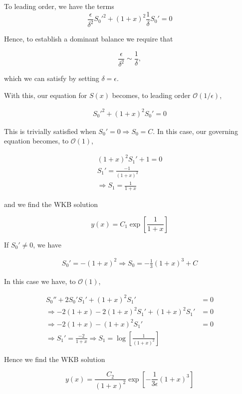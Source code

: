 \documentclass[12pt, a4paper]{article}
\begin{document}
\begin{enumerate}
\begin{enumerate}
        To leading order, we have the terms $$\frac{\epsilon}{\delta^2} {S_0'}^2 + (1+x)^2 \frac{1}{\delta} S_0' = 0$$

        Hence, to establish a dominant balance we require that

        $$\frac{\epsilon}{\delta^2} \sim \frac{1}{\delta},$$

        which we can satisfy by setting $\delta = \epsilon$. 

        With this, our equation for $S(x)$ becomes, to leading order $\mathcal O(1/\epsilon)$, 

        \begin{align*}
            {S_0'}^2 + (1+x)^2 S_0' = 0 
        \end{align*}

        This is trivially satisfied when $S_0'=0 \Rightarrow S_0 = C$. In this case, our governing equation becomes, to $\mathcal O(1)$, 

        \begin{align*}
            (1+x)^2 S_1' + 1 = 0 \\ S_1' = \frac{-1}{(1+x)^2} \\ \Rightarrow S_1 = \frac{1}{1+x}
        \end{align*}

        and we find the WKB solution 

        $$y(x) = C_1 \exp \left[  \frac{1}{1+x} \right]$$
        
        If $S_0' \ne 0$, we have 

        \begin{align*}
            S_0' = -(1+x)^2 \Rightarrow S_0 = - \frac{1}{3} (1+x)^3 + C
        \end{align*}

        In this case we have, to $\mathcal O(1)$, 

        \begin{align*}
            S_0'' + 2 S_0' S_1' + (1+x)^2 S_1' &= 0 \\
            \Rightarrow -2(1+x) -2(1+x)^2 S_1' + (1+x)^2 S_1' &= 0 \\
            \Rightarrow -2(1+x) - (1+x)^2 S_1' &= 0 \\
            \Rightarrow S_1' = \frac{-2}{1+x} \Rightarrow S_1 = \log \left[ \frac{1}{(1+x)^2} \right]
        \end{align*}

        Hence we find the WKB solution 

        $$y(x) = \frac{C_2}{(1+x)^2} \exp \left[ - \frac{1}{3\epsilon} (1+x)^3  \right]$$


\end{enumerate}
\end{enumerate}
\end{document}
